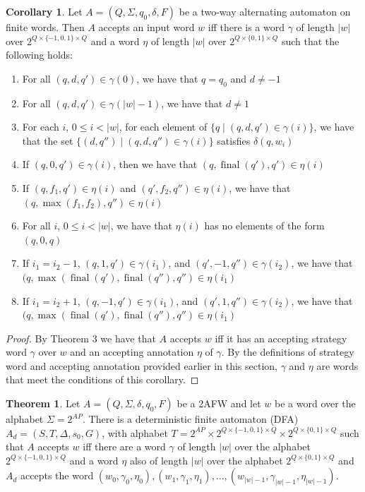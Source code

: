 \documentclass{lmcs}
\theoremstyle{definition}
\newtheorem{theorem}[thm]{Theorem}
\DeclareMathOperator{\?}{?}
\DeclareMathOperator{\final}{final}
\newtheorem{corollary}[theorem]{Corollary}
\begin{document}
\begin{corollary}
Let $A = (Q, \Sigma, q_0, \delta, F)$ be a two-way alternating automaton on finite words. Then $A$ accepts an input word $w$ iff there is a word $\gamma$ of length $|w|$ over $2^{Q \times \{-1,0,1\} \times Q}$ and a word $\eta$ of length $|w|$ over $2^{Q \times \{0,1\} \times Q}$ such that the following holds:

\begin{enumerate}
    \item For all $(q,d,q') \in \gamma(0)$, we have that $q = q_0$ and $d \neq -1$
    \item For all $(q,d,q') \in \gamma(|w|-1)$, we have that $d \neq 1$
    \item For each $i$, $0 \leq i < |w|$, for each element of $\{q \mid (q,d,q') \in \gamma(i)\}$, we have that the set $\{(d,q'') \mid (q,d,q'') \in \gamma(i)\}$ satisfies $\delta(q,w_i)$
    \item If $(q,0,q') \in \gamma(i)$, then we have that $(q,\final(q'),q') \in \eta(i)$
       \item If $(q,f_1,q') \in \eta(i)$ and $(q',f_2,q'') \in \eta(i)$, we have that $(q,\max(f_1,f_2),q'') \in \eta(i)$
    \item For all $i$, $0 \leq i < |w|$, we have that $\eta(i)$ has no elements of the form $(q,0,q)$

    \item If $i_1 = i_2-1$, $(q,1,q') \in \gamma(i_1)$, and $(q',-1,q'') \in \gamma(i_2)$, we have that $(q,\max(\final(q'),\allowbreak \final(q''),q'') \in \eta(i_1)$
    \item If $i_1 = i_2+1$, $(q,-1,q') \in \gamma(i_1)$, and $(q',1,q'') \in \gamma(i_2)$, we have that $(q,\max(\final(q'),\allowbreak \final(q''),q'') \in \eta(i_1)$




\end{enumerate}

\end{corollary}
\begin{proof}
By Theorem 3 we have that $A$ accepts $w$ iff it has an accepting strategy word $\gamma$ over $w$ and an accepting annotation $\eta$ of $\gamma$. By the definitions of strategy word and accepting annotation provided earlier in this section, $\gamma$ and $\eta$ are words that meet the conditions of this corollary.
\end{proof}

\begin{theorem}
  Let $A = (Q,\Sigma,\delta,q_0,F)$ be a 2AFW and let $w$ be a word over the alphabet $\Sigma=2^{AP}$. There is a deterministic finite automaton (DFA) $A_d = (S,T,\Delta,s_0,G)$, with alphabet $T = 2^{AP} \times 2^{Q \times \{-1,0,1\} \times Q} \times 2^{Q \times \{0,1\} \times Q}$ such that $A$ accepts $w$ iff there are a word $\gamma$ of length $|w|$ over the alphabet $2^{Q \times \{-1,0,1\}\times Q}$ and a word $\eta$ also of length $|w|$ over the alphabet $2^{Q \times \{0,1\}\times Q}$ and $A_d$ accepts the word $(w_0, \gamma_0, \eta_0), (w_1, \gamma_1, \eta_1), \ldots, (w_{|w|-1}, \gamma_{|w|-1}, \eta_{|w|-1})$.

\end{theorem}
\end{document}
